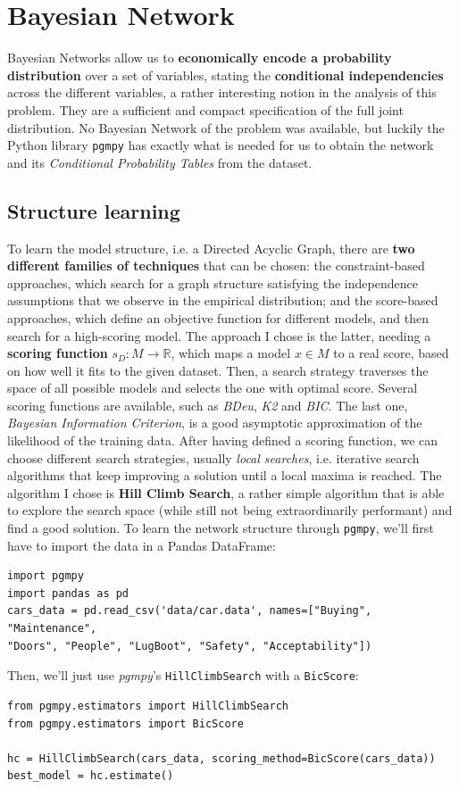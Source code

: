 \section{Bayesian Network}
\label{sec:bayesiannet}
Bayesian Networks allow us to \textbf{economically encode a probability distribution} over a set of variables, stating the \textbf{conditional independencies} across the different variables, a rather interesting notion in the analysis of this problem. They are a sufficient and compact specification of the full joint distribution. No Bayesian Network of the problem was available, but luckily the Python library \texttt{pgmpy} has exactly what is needed for us to obtain the network and its \textit{Conditional Probability Tables} from the dataset.
\subsection{Structure learning}
To learn the model structure, i.e. a Directed Acyclic Graph, there are \textbf{two different families of techniques} that can be chosen: the constraint-based approaches, which search for a graph structure satisfying the independence assumptions that we observe in the empirical distribution; and the score-based approaches, which define an objective function for different models, and then search for a high-scoring model. \cite{book:probgraphmod}
The approach I chose is the latter, needing a \textbf{scoring function} $s_D: M \rightarrow \mathbb{R}$, which maps a model $x \in M$ to a real score, based on how well it fits to the given dataset. Then, a search strategy traverses the space of all possible models and selects the one with optimal score. Several scoring functions are available, such as \textit{BDeu}, \textit{K2} and \textit{BIC}. The last one, \textit{Bayesian Information Criterion}, is a good asymptotic approximation of the likelihood of the training data. After having defined a scoring function, we can choose different search strategies, usually \textit{local searches}, i.e. iterative search algorithms that keep improving a solution until a local maxima is reached. The algorithm I chose is \textbf{Hill Climb Search}, a rather simple algorithm that is able to explore the search space (while still not being extraordinarily performant) and find a good solution. 
To learn the network structure through \texttt{pgmpy}, we'll first have to import the data in a Pandas DataFrame:
\begin{verbatim}
import pgmpy
import pandas as pd
cars_data = pd.read_csv('data/car.data', names=["Buying", "Maintenance",
"Doors", "People", "LugBoot", "Safety", "Acceptability"])
\end{verbatim}
Then, we'll just use \textit{pgmpy}'s \texttt{HillClimbSearch} with a \texttt{BicScore}:
\begin{verbatim}
from pgmpy.estimators import HillClimbSearch
from pgmpy.estimators import BicScore

hc = HillClimbSearch(cars_data, scoring_method=BicScore(cars_data))
best_model = hc.estimate()
\end{verbatim}

